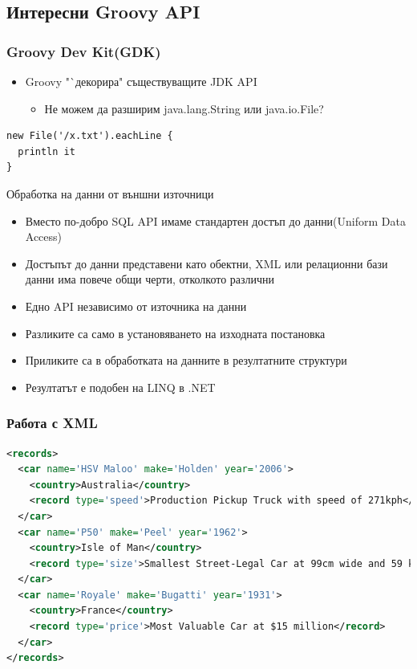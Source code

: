 \documentclass[compress,red]{beamer}
\begin{document}
\subsection{Интересни Groovy API}
\begin{frame}[fragile]
  \frametitle{Groovy Dev Kit(GDK)}
  \transdissolve
  \begin{itemize}
  \item Groovy "`декорира" съществуващите JDK API
  \begin{itemize}
    \item Не можем да разширим java.lang.String или java.io.File?
  \end{itemize}
  \end{itemize}
  \begin{lstlisting}
new File('/x.txt').eachLine {
  println it
}
  \end{lstlisting}

\end{frame}

\begin{frame}{Обработка на данни от външни източници}
  \transdissolve
  \begin{itemize}
    \item Вместо по-добро SQL API имаме стандартен достъп до
      данни(Uniform Data Access)
    \item Достъпът до данни представени като обектни, XML или
      релационни бази данни има повече общи черти, отколкото различни
    \item Едно API независимо от източника на данни
    \item Разликите са само в установяването на изходната постановка
    \item Приликите са в обработката на данните в резултатните структури
    \item Резултатът е подобен на LINQ в .NET
  \end{itemize}
\end{frame}

\begin{frame}[fragile]
  \frametitle{Работа с XML}
  \transdissolve
\begin{lstlisting}[basicstyle=\tiny,language=XML]
<records>
  <car name='HSV Maloo' make='Holden' year='2006'>
    <country>Australia</country>
    <record type='speed'>Production Pickup Truck with speed of 271kph</record>
  </car>
  <car name='P50' make='Peel' year='1962'>
    <country>Isle of Man</country>
    <record type='size'>Smallest Street-Legal Car at 99cm wide and 59 kg weight</record>
  </car>
  <car name='Royale' make='Bugatti' year='1931'>
    <country>France</country>
    <record type='price'>Most Valuable Car at $15 million</record>
  </car>
</records>
\end{lstlisting}
\end{frame}
\end{document}
